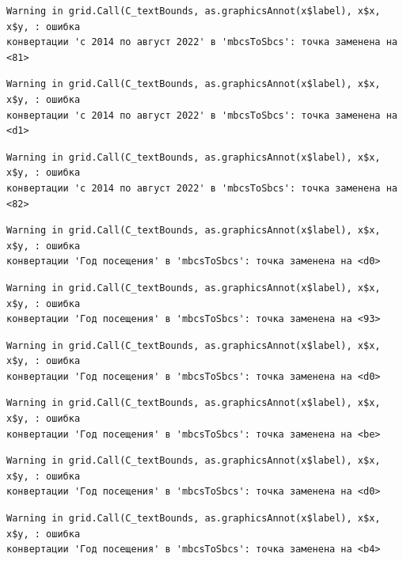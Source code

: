 \documentclass[
  letterpaper,
  DIV=11,
  numbers=noendperiod]{scrreprt}
\begin{document}
\begin{verbatim}
Warning in grid.Call(C_textBounds, as.graphicsAnnot(x$label), x$x, x$y, : ошибка
конвертации 'с 2014 по август 2022' в 'mbcsToSbcs': точка заменена на <81>
\end{verbatim}

\begin{verbatim}
Warning in grid.Call(C_textBounds, as.graphicsAnnot(x$label), x$x, x$y, : ошибка
конвертации 'с 2014 по август 2022' в 'mbcsToSbcs': точка заменена на <d1>
\end{verbatim}

\begin{verbatim}
Warning in grid.Call(C_textBounds, as.graphicsAnnot(x$label), x$x, x$y, : ошибка
конвертации 'с 2014 по август 2022' в 'mbcsToSbcs': точка заменена на <82>
\end{verbatim}

\begin{verbatim}
Warning in grid.Call(C_textBounds, as.graphicsAnnot(x$label), x$x, x$y, : ошибка
конвертации 'Год посещения' в 'mbcsToSbcs': точка заменена на <d0>
\end{verbatim}

\begin{verbatim}
Warning in grid.Call(C_textBounds, as.graphicsAnnot(x$label), x$x, x$y, : ошибка
конвертации 'Год посещения' в 'mbcsToSbcs': точка заменена на <93>
\end{verbatim}

\begin{verbatim}
Warning in grid.Call(C_textBounds, as.graphicsAnnot(x$label), x$x, x$y, : ошибка
конвертации 'Год посещения' в 'mbcsToSbcs': точка заменена на <d0>
\end{verbatim}

\begin{verbatim}
Warning in grid.Call(C_textBounds, as.graphicsAnnot(x$label), x$x, x$y, : ошибка
конвертации 'Год посещения' в 'mbcsToSbcs': точка заменена на <be>
\end{verbatim}

\begin{verbatim}
Warning in grid.Call(C_textBounds, as.graphicsAnnot(x$label), x$x, x$y, : ошибка
конвертации 'Год посещения' в 'mbcsToSbcs': точка заменена на <d0>
\end{verbatim}

\begin{verbatim}
Warning in grid.Call(C_textBounds, as.graphicsAnnot(x$label), x$x, x$y, : ошибка
конвертации 'Год посещения' в 'mbcsToSbcs': точка заменена на <b4>
\end{verbatim}
\end{document}
